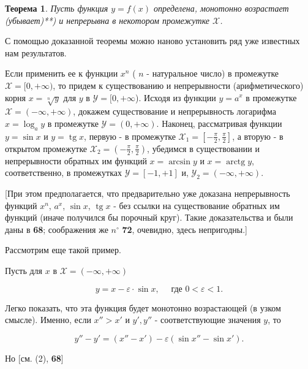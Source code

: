 \documentclass[10pt, twoside]{article}
\newtheorem*{theorem}{Теорема}
\newcounter{subtopic}
\begin{document}
\begin{theorem}
  Пусть функция $y=f(x)$ определена, монотонно возрастает (убывает)**) и непрерывна в некотором промежутке $\mathcal{X}$.
\end{theorem}



\newpage
\setcounter{page}{174}
\setcounter{subtopic}{83}
С помощью доказанной теоремы можно наново установить ряд уже известных нам результатов.

Если применить ее к функции $x^{n}$ ( $n$ - натуральное число) в промежутке $\mathscr{X}=[0,+\infty)$, то придем к существованию и непрерывности (арифметического) корня $x=\sqrt[n]{y}$ для $y$ в $\mathscr{Y}=[0,+\infty$).
Исходя из функции $y=a^{x}$ в промежутке $\mathscr{X}=(-\infty,+\infty)$, докажем существование и непрерывность логарифма $x=\log _{a} y$ в промежутке $\mathscr{Y}=(0,+\infty)$. Наконец, рассматривая функции $y=\sin x$ и $y=\operatorname{tg} x$, первую - в промежутке $\mathscr{X}_{1}=\left[-\frac{\pi}{2}, \frac{\pi}{2}\right]$, а вторую - в открытом промежутке $\mathscr{X}_{2}=\left(-\frac{\pi}{2}, \frac{\pi}{2}\right)$, убедимся в существовании и непрерывности обратных им функций $x=\arcsin y$ и $x=\operatorname{arctg} y$, соответственно, в промежутках $\mathscr{Y}=[-1,+1]$ и, $\mathscr{Y}_{2}=(-\infty,+\infty)$.

  [При этом предполагается, что предварительно уже доказана непрерывность функций $x^{n}$, $a^{x}$, $\sin x$, $\operatorname{tg} x$ - без ссылки на существование обратных им функций (иначе получился бы порочный круг). Такие доказательства и были даны в \textbf{68}; соображения же $n^{\circ}$ \textbf{72}, очевидно, здесь непригодны.]

Рассмотрим еще такой пример.

Пусть для $x$ в $\mathscr{X}=(-\infty,+\infty)$


\begin{equation*}
  y=x-\varepsilon \cdot \sin x, \quad \text { где } 0<\varepsilon<1 . \tag{3}
\end{equation*}


Легко показать, что эта функция будет монотонно возрастающей (в узком смысле). Именно, если $x''>x'$ и $y', y''$ - соответствующие значения $y$, то

$$
  y''-y'=\left(x''-x'\right)-\varepsilon\left(\sin x''-\sin x'\right).
$$

Но [см. (2), \textbf{68}]
\end{document}
